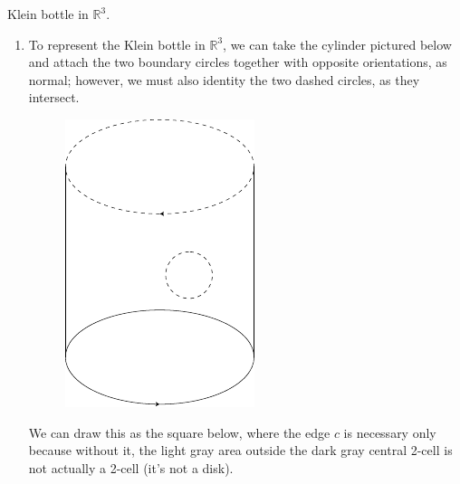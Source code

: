 \documentclass[twoside,10pt]{article}
\begin{document}

\begin{exer}[1.2: 12]
Klein bottle in $\mathbb{R}^{3}$.
\end{exer}

\begin{enumerate}
	\item To represent the Klein bottle in $\mathbb{R}^{3}$, we can take the cylinder pictured below and attach the two boundary circles together with opposite orientations, as normal; however, we must also identity the two dashed circles, as they intersect.

		\begin{figure}[H]
			\centering
			\includegraphics[scale=0.8]{fig/12a.pdf}
		\end{figure}

		We can draw this as the square below, where the edge $c$ is necessary only because without it, the light gray area outside the dark gray central 2-cell is not actually a 2-cell (it's not a disk).


\end{enumerate}
\end{document}
